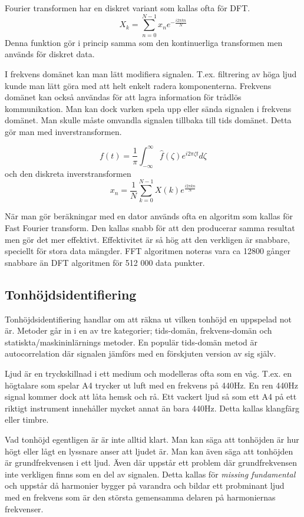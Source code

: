 Fourier transformen har en diskret variant som kallas ofta för DFT. 
$$X_k = \sum_{n=0}^{N-1} x_ne^{-\frac{i2\pi kn}{N}}$$
Denna funktion gör i princip samma som den kontinuerliga transformen men används för diskret data.

I frekvens domänet kan man lätt modifiera signalen. T.ex. filtrering av höga ljud kunde man lätt göra med att helt enkelt radera komponenterna. Frekvens domänet kan också användas för att lagra information för trådlös kommunikation. Man kan dock varken spela upp eller sända signalen i frekvens domänet. Man skulle måste omvandla signalen tillbaka till tids domänet. Detta gör man med inverstransformen. 

$$ f(t) = \frac{1}{\pi}\int_{-\infty}^{\infty} \hat{f}(\zeta)e^{i2\pi\zeta t} d\zeta$$
och den diskreta inverstransformen
$$ x_n = \frac{1}{N}\sum_{k=0}^{N-1} X(k)e^{\frac{i2\pi kn}{N}}$$

När man gör beräkningar med en dator används ofta en algoritm som kallas för Fast Fourier transform. Den kallas snabb för att den producerar samma resultat men  gör det mer effektivt. Effektivitet är så hög att den verkligen är snabbare, speciellt för stora data mängder. FFT algoritmen noteras vara ca 12800 gånger snabbare än DFT algoritmen för 512 000 data punkter.  
\subsection{Tonhöjdsidentifiering}
Tonhöjdsidentifiering handlar om att räkna ut vilken tonhöjd en uppspelad not är. Metoder går in i en av tre kategorier; tids-domän, frekvens-domän och statiskta/maskininlärnings metoder. En populär tids-domän metod är autocorrelation där signalen jämförs med en förskjuten version av sig själv. 

Ljud är en tryckskillnad i ett medium och modelleras ofta som en våg. T.ex. en högtalare som spelar A4 trycker ut luft med en frekvens på 440Hz. En ren 440Hz signal kommer dock att låta hemsk och rå. Ett vackert ljud så som ett A4 på ett riktigt instrument innehåller mycket annat än bara 440Hz. Detta kallas klangfärg eller timbre.

Vad tonhöjd egentligen är är inte alltid klart. Man kan säga att tonhöjden är hur högt eller lågt en lyssnare anser att ljudet är. Man kan även säga att tonhöjden är grundfrekvensen i ett ljud. Även där uppstår ett problem där grundfrekvensen inte verkligen finns som en del av signalen. Detta kallas för \textit{missing fundamental} och uppstår då harmonier bygger på varandra och bildar ett probminant ljud med en frekvens som är den största gemensamma delaren på harmoniernas frekvenser.

